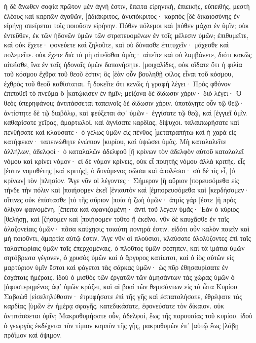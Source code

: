 ἡ δὲ ἄνωθεν σοφία πρῶτον μὲν ἁγνή ἐστιν, ἔπειτα εἰρηνική, ἐπιεικής, εὐπειθής, μεστὴ ἐλέους καὶ καρπῶν ἀγαθῶν, [ἀδιάκριτος, ἀνυπόκριτος· 
καρπὸς [δὲ δικαιοσύνης ἐν εἰρήνῃ σπείρεται τοῖς ποιοῦσιν εἰρήνην. 
Πόθεν πόλεμοι καὶ [πόθεν μάχαι ἐν ὑμῖν; οὐκ ἐντεῦθεν, ἐκ τῶν ἡδονῶν ὑμῶν τῶν στρατευομένων ἐν τοῖς μέλεσιν ὑμῶν; 
ἐπιθυμεῖτε, καὶ οὐκ ἔχετε· φονεύετε καὶ ζηλοῦτε, καὶ οὐ δύνασθε ἐπιτυχεῖν· μάχεσθε καὶ πολεμεῖτε. οὐκ ἔχετε διὰ τὸ μὴ αἰτεῖσθαι ὑμᾶς· 
αἰτεῖτε καὶ οὐ λαμβάνετε, διότι κακῶς αἰτεῖσθε, ἵνα ἐν ταῖς ἡδοναῖς ὑμῶν δαπανήσητε. 
[μοιχαλίδες, οὐκ οἴδατε ὅτι ἡ φιλία τοῦ κόσμου ἔχθρα τοῦ θεοῦ ἐστιν; ὃς [ἐὰν οὖν βουληθῇ φίλος εἶναι τοῦ κόσμου, ἐχθρὸς τοῦ θεοῦ καθίσταται. 
ἢ δοκεῖτε ὅτι κενῶς ἡ γραφὴ λέγει· Πρὸς φθόνον ἐπιποθεῖ τὸ πνεῦμα ὃ [κατῴκισεν ἐν ἡμῖν; 
μείζονα δὲ δίδωσιν χάριν· διὸ λέγει· Ὁ θεὸς ὑπερηφάνοις ἀντιτάσσεται ταπεινοῖς δὲ δίδωσιν χάριν. 
ὑποτάγητε οὖν τῷ θεῷ· ἀντίστητε δὲ τῷ διαβόλῳ, καὶ φεύξεται ἀφ᾽ ὑμῶν· 
ἐγγίσατε τῷ θεῷ, καὶ [ἐγγιεῖ ὑμῖν. καθαρίσατε χεῖρας, ἁμαρτωλοί, καὶ ἁγνίσατε καρδίας, δίψυχοι. 
ταλαιπωρήσατε καὶ πενθήσατε καὶ κλαύσατε· ὁ γέλως ὑμῶν εἰς πένθος [μετατραπήτω καὶ ἡ χαρὰ εἰς κατήφειαν· 
ταπεινώθητε ἐνώπιον [κυρίου, καὶ ὑψώσει ὑμᾶς. 
Μὴ καταλαλεῖτε ἀλλήλων, ἀδελφοί· ὁ καταλαλῶν ἀδελφοῦ [ἢ κρίνων τὸν ἀδελφὸν αὐτοῦ καταλαλεῖ νόμου καὶ κρίνει νόμον· εἰ δὲ νόμον κρίνεις, οὐκ εἶ ποιητὴς νόμου ἀλλὰ κριτής. 
εἷς [ἐστιν νομοθέτης [καὶ κριτής], ὁ δυνάμενος σῶσαι καὶ ἀπολέσαι· σὺ δὲ τίς εἶ, [ὁ κρίνων] τὸν [πλησίον. 
Ἄγε νῦν οἱ λέγοντες· Σήμερον [ἢ αὔριον [πορευσόμεθα εἰς τήνδε τὴν πόλιν καὶ [ποιήσομεν ἐκεῖ [ἐνιαυτὸν καὶ [ἐμπορευσόμεθα καὶ [κερδήσομεν· 
οἵτινες οὐκ ἐπίστασθε [τὸ τῆς αὔριον [ποία ἡ ζωὴ ὑμῶν· ἀτμὶς γάρ [ἐστε [ἡ πρὸς ὀλίγον φαινομένη, [ἔπειτα καὶ ἀφανιζομένη· 
ἀντὶ τοῦ λέγειν ὑμᾶς· Ἐὰν ὁ κύριος [θελήσῃ, καὶ [ζήσομεν καὶ [ποιήσομεν τοῦτο ἢ ἐκεῖνο. 
νῦν δὲ καυχᾶσθε ἐν ταῖς ἀλαζονείαις ὑμῶν· πᾶσα καύχησις τοιαύτη πονηρά ἐστιν. 
εἰδότι οὖν καλὸν ποιεῖν καὶ μὴ ποιοῦντι, ἁμαρτία αὐτῷ ἐστιν. 
Ἄγε νῦν οἱ πλούσιοι, κλαύσατε ὀλολύζοντες ἐπὶ ταῖς ταλαιπωρίαις ὑμῶν ταῖς ἐπερχομέναις. 
ὁ πλοῦτος ὑμῶν σέσηπεν, καὶ τὰ ἱμάτια ὑμῶν σητόβρωτα γέγονεν, 
ὁ χρυσὸς ὑμῶν καὶ ὁ ἄργυρος κατίωται, καὶ ὁ ἰὸς αὐτῶν εἰς μαρτύριον ὑμῖν ἔσται καὶ φάγεται τὰς σάρκας ὑμῶν· ὡς πῦρ ἐθησαυρίσατε ἐν ἐσχάταις ἡμέραις. 
ἰδοὺ ὁ μισθὸς τῶν ἐργατῶν τῶν ἀμησάντων τὰς χώρας ὑμῶν ὁ [ἀφυστερημένος ἀφ᾽ ὑμῶν κράζει, καὶ αἱ βοαὶ τῶν θερισάντων εἰς τὰ ὦτα Κυρίου Σαβαὼθ [εἰσεληλύθασιν· 
ἐτρυφήσατε ἐπὶ τῆς γῆς καὶ ἐσπαταλήσατε, ἐθρέψατε τὰς καρδίας [ὑμῶν ἐν ἡμέρᾳ σφαγῆς. 
κατεδικάσατε, ἐφονεύσατε τὸν δίκαιον. οὐκ ἀντιτάσσεται ὑμῖν; 
Μακροθυμήσατε οὖν, ἀδελφοί, ἕως τῆς παρουσίας τοῦ κυρίου. ἰδοὺ ὁ γεωργὸς ἐκδέχεται τὸν τίμιον καρπὸν τῆς γῆς, μακροθυμῶν ἐπ᾽ [αὐτῷ ἕως [λάβῃ πρόϊμον καὶ ὄψιμον. 
